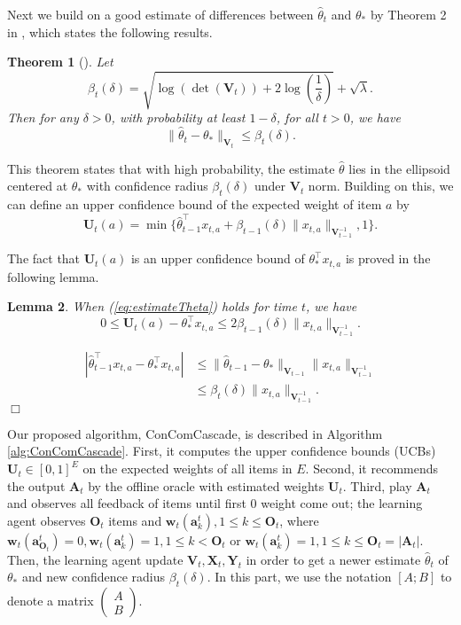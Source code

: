\documentclass{article}
\newcommand{\bA}{\mathbf{A}}
\newcommand{\ba}{\mathbf{a}}
\newcommand{\bO}{\mathbf{O}}
\newcommand{\bU}{\mathbf{U}}
\newcommand{\bV}{\mathbf{V}}
\newcommand{\bw}{\mathbf{w}}
\newcommand{\bX}{\mathbf{X}}
\newcommand{\bY}{\mathbf{Y}}
\newcommand{\abs}[1]{\left| #1 \right|}
\newcommand{\norm}[1]{\| #1 \|}
\newtheorem{theorem}{Theorem}[section]
\newtheorem{lemma}[theorem]{Lemma}%
\newenvironment{proof}{\noindent {\textbf{Proof. }}}{$\Box$ \medskip}
\begin{document}
Next we build on a good estimate of differences between $\hat{\theta}_t$ and $\theta_*$ by Theorem 2 in \cite{abbasi2011improved}, which states the following results.
	
\begin{theorem}[\cite{abbasi2011improved}]
\label{thm:theta_estimate}
Let 
$$
\beta_{t}(\delta) = \sqrt{\log(\det(\bV_{t})) + 2 \log(\frac{1}{\delta})} + \sqrt{\lambda}.
$$
Then for any $\delta > 0$, with probability at least $1 - \delta$, for all $t > 0$, we have
\begin{equation}
\label{eq:estimateTheta}
\norm{\hat{\theta}_t - \theta_*}_{\bV_{t}} \leq \beta_{t}(\delta).
\end{equation}
\end{theorem}

This theorem states that with high probability, the estimate $\hat{\theta}$ lies in the ellipsoid centered at $\theta_*$  with confidence radius $\beta_t(\delta)$ under $\bV_t$ norm. Building on this, we can define an upper confidence bound of the expected weight of item $a$ by
\begin{equation}
\bU_t(a) = \min\{\hat{\theta}_{t-1}^{\top}x_{t,a} + \beta_{t-1}(\delta)\norm{x_{t,a}}_{\bV_{t-1}^{-1}}, 1\}.
\end{equation}

The fact that $\bU_t(a)$ is an upper confidence bound of $\theta_*^{\top}x_{t,a}$ is proved in the following lemma.
\begin{lemma}
\label{lem:estimateU}
When (\ref{eq:estimateTheta}) holds for time $t$, we have
$$
0 \leq \bU_t(a) - \theta_*^{\top}x_{t,a} \leq 2\beta_{t-1}(\delta)\norm{x_{t,a}}_{\bV_{t-1}^{-1}}.
$$
\end{lemma}
\begin{proof}
\begin{align*}
\abs{\hat{\theta}_{t-1}^{\top}x_{t,a} - \theta_*^{\top}x_{t,a}} &\leq \norm{\hat{\theta}_{t-1} - \theta_*}_{\bV_{t-1}} \norm{x_{t,a}}_{\bV_{t-1}^{-1}} \\
&\leq \beta_{t}(\delta)\norm{x_{t,a}}_{\bV_{t-1}^{-1}}.
\end{align*}
\end{proof}

Our proposed algorithm, ConComCascade, is described in Algorithm \ref{alg:ConComCascade}. First, it computes the upper confidence bounds (UCBs) $\bU_t \in [0,1]^{E}$ on the expected weights of all items in $E$. Second, it recommends the output $\bA_t$ by the offline oracle with estimated weights $\bU_t$. Third, play $\bA_t$ and observes all feedback of items until first $0$ weight come out; the learning agent observes $\bO_t$ items and $\bw_t(\ba_k^t), 1 \leq k \leq \bO_t$, where $\bw_t(\ba_{\bO_t}^t) = 0, \bw_t(\ba_k^t) = 1, 1 \leq k < \bO_t$ or $\bw_t(\ba_k^t) = 1, 1 \leq k \leq \bO_t = \abs{\bA_t}$. Then, the learning agent update $\bV_t, \bX_t, \bY_t$ in order to get a newer estimate $\hat{\theta}_t$ of $\theta_*$ and new confidence radius $\beta_t(\delta)$. In this part, we use the notation $[A; B]$ to denote a matrix $\begin{pmatrix} A\\ B\end{pmatrix}$.
\end{document}

